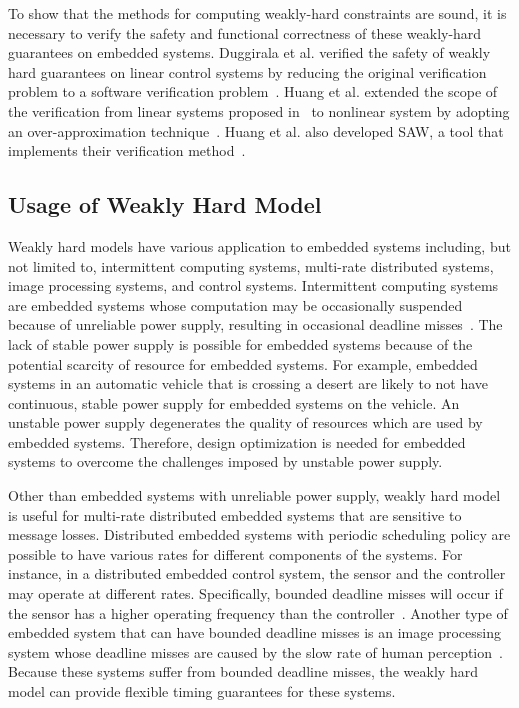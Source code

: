 To show that the methods for computing weakly-hard constraints are sound, it is necessary to verify the safety and functional correctness of these weakly-hard guarantees on embedded systems. Duggirala et al. verified the safety of weakly hard guarantees on linear control systems by reducing the original verification problem to a software verification problem~\cite{duggirala2015analyzing}. Huang et al. extended the scope of the verification from linear systems proposed in~\cite{duggirala2015analyzing} to nonlinear system by adopting an over-approximation technique~\cite{huang2019formal}. Huang et al. also developed SAW, a tool that implements their verification method~\cite{huang2020saw}. 

\subsection{Usage of Weakly Hard Model}
Weakly hard models have various application to embedded systems including, but not limited to, intermittent computing systems, multi-rate distributed systems, image processing systems, and control systems. Intermittent computing systems are embedded systems whose computation may be occasionally suspended because of unreliable power supply, resulting in occasional deadline misses~\cite{talla2015powering, balsamo2016hibernus, colin2016chain, lucia2017intermittent}. The lack of stable power supply is possible for embedded systems because of the potential scarcity of resource for embedded systems. For example, embedded systems in an automatic vehicle that is crossing a desert are likely to not have continuous, stable power supply for embedded systems on the vehicle. An unstable power supply degenerates the quality of resources which are used by embedded systems. Therefore, design optimization is needed for embedded systems to overcome the challenges imposed by unstable power supply. 

Other than embedded systems with unreliable power supply, weakly hard model is useful for multi-rate distributed embedded systems that are sensitive to message losses. Distributed embedded systems with periodic scheduling policy are possible to have various rates for different components of the systems. For instance, in a distributed embedded control system, the sensor and the controller may operate at different rates. Specifically, bounded deadline misses will occur if the sensor has a higher operating frequency than the controller~\cite{li2015design}. Another type of embedded system that can have bounded deadline misses is an image processing system whose deadline misses are caused by the slow rate of human perception~\cite{yang2010adaboost}. Because these systems suffer from bounded deadline misses, the weakly hard model can provide flexible timing guarantees for these systems. 


